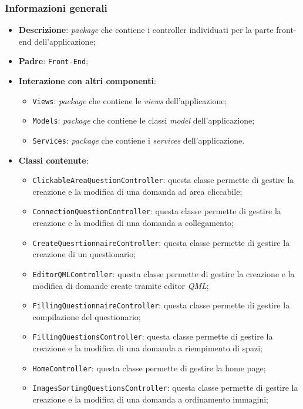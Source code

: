 \subsubsection{Informazioni generali}
\begin{itemize}
	\item \textbf{Descrizione}: \textit{package} che contiene i controller individuati per la parte front-end dell'applicazione;
	\item \textbf{Padre}: \texttt{Front-End};
	\item \textbf{Interazione con altri componenti}:
	\begin{itemize}
		\item \texttt{Views}: \textit{package} che contiene le \textit{views} dell'applicazione;
		\item \texttt{Models}: \textit{package} che contiene le classi \textit{model} dell'applicazione;
		\item \texttt{Services}: \textit{package} che contiene i \textit{services} dell'applicazione.
	\end{itemize}
	\item \textbf{Classi contenute}:
	\begin{itemize}
		\item \texttt{ClickableAreaQuestionController}: questa classe permette di gestire la creazione e la modifica di una domanda ad area cliccabile;
		\item \texttt{ConnectionQuestionController}: questa classe permette di gestire la creazione e la modifica di una domanda a collegamento;
		\item \texttt{CreateQuesrtionnaireController}: questa classe permette di gestire la creazione di un questionario;
		\item \texttt{EditorQMLController}: questa classe permette di gestire la creazione e la modifica di domande create tramite editor \textit{QML};
		\item \texttt{FillingQuestionnaireController}: questa classe permette di gestire la compilazione del questionario;
		\item \texttt{FillingQuestionsController}: questa classe permette di gestire la creazione e la modifica di una domanda	a riempimento di spazi;
		\item \texttt{HomeController}: questa classe permette di gestire la home page;
		\item \texttt{ImagesSortingQuestionsController}: questa classe permette di gestire la creazione e la modifica di una domanda a ordinamento immagini;

\end{itemize}
\end{itemize}
